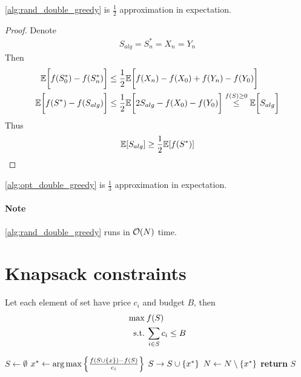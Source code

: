 \begin{theorem}
	\vref{alg:rand_double_greedy} is $\frac{1}{2}$ approximation in expectation.
	\begin{proof}
		Denote 
		\begin{align}
			S_{alg} = S^*_n=X_n=Y_n
		\end{align}
		Then
		\begin{align}
		\mathbb{E} \qty\bigg[f(S^*_{0}) - f(S^*_n)] &\leq \frac{1}{2} \mathbb{E} \qty\bigg[f(X_n) - f(X_{0})+f(Y_n) - f(Y_{0}) ]\\
		\mathbb{E} \qty\bigg[f(S^*) - f(S_{alg})] &\leq \frac{1}{2} \mathbb{E} \qty\bigg[2S_{alg} - f(X_{0}) - f(Y_{0}) ]\stackrel{f(S)\geq 0}{\leq} \mathbb{E} \qty\bigg[S_{alg} ]
		\end{align}
		Thus
		\begin{align}
		\mathbb{E} \qty[S_{alg} ] \geq\frac{1}{2}\mathbb{E} \qty[f(S^*)] 
		\end{align}
		
	\end{proof}

\begin{coll}
	\vref{alg:opt_double_greedy} is $\frac{1}{3}$ approximation in expectation.
\end{coll}
\end{theorem}


\paragraph{Note} \vref{alg:rand_double_greedy} runs in $\order{N}$ time.


\section{Knapsack constraints}
Let each element of set have price $c_i$ and budget $B$, then
\begin{align}
\max \: & f(S)\\
\text{s.t.} \: & \sum_{i \in S} c_i \leq B
\end{align}


\begin{algorithm}
	\caption{}\label{alg:knapsack_greedy}
	\begin{algorithmic}[1]
		\State $S \gets \emptyset$
		\State $x^* \gets \arg \max \qty{ \frac{f(S\cup \qty{x})-f(S)}{c_i}}$
		\State $S\to S \cup \qty{x^*}$
		\EndIf
		\State $N \gets N\setminus \qty{x^*}$
		\EndWhile
		\State \textbf{return} $S$
		\EndProcedure
	\end{algorithmic}
\end{algorithm}

